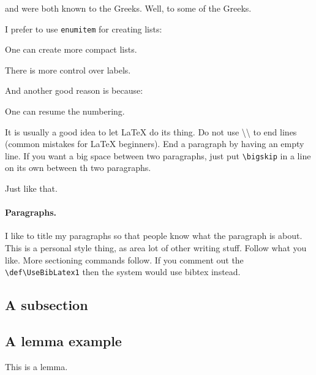 \documentclass[12pt]{article}
\begin{document}
 and  were both known to the Greeks. Well,
to some of the Greeks.

\bigskip

I prefer to use \texttt{enumitem} for creating lists:
\begin{compactenumI}
    \smallskip%
    \item One can create more compact lists.

    \smallskip%
    \item There is more control over labels.
\end{compactenumI}
\smallskip%
And another good reason is because:
\begin{compactenumI}[resume]
    \smallskip%
    \item One can resume the numbering.
\end{compactenumI}

\bigskip%

It is usually a good idea to let \LaTeX{} do its thing. Do not use
\textbackslash\textbackslash{} to end lines (common mistakes for
\LaTeX{} beginners). End a paragraph by having an empty line. If you
want a big space between two paragraphs, just put
\texttt{\textbackslash{big{}skip}} in a line on its own between th two
paragraphs.

\bigskip

Just like that.


\paragraph{Paragraphs.}

I like to title my paragraphs so that people know what the paragraph
is about. This is a personal style thing, as area lot of other writing
stuff. Follow what you like. More sectioning commands follow. If you
comment out the
\texttt{\textbackslash{}def\textbackslash{}UseBibLatex{1}} then the
system would use bibtex instead.

\subsection{A subsection}

\subsection{A lemma example}

\begin{lemma}
    This is a lemma.
\end{lemma}
\end{document}
